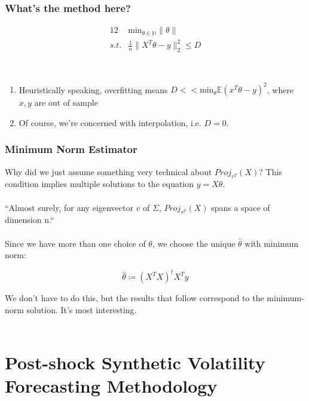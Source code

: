 \documentclass[pdf]{beamer}
\begin{document}
\begin{frame}
\frametitle{What's the method here?}
    \begin{alignat*}{12}
    & \text{min}_{\theta \in \mathbb{H}}\|\theta\| \\
     s.t. & \frac{1}{n}\|X^{T}\theta - y\|^{2}_{2} \leq D
    \end{alignat*}

\\
\begin{enumerate}
\item<3-4> Heuristically speaking, overfitting means $D << \text{min}_{\theta}\mathbb{E}(x^{T}\theta - y)^{2} $, where $x, y$ are out of sample
\item<4-4> Of course, we're concerned with interpolation, i.e. $D=0$.
\end{enumerate}

\end{frame}

\begin{frame}
\frametitle{Minimum Norm Estimator}

Why did we just assume something very technical about $Proj_{v^{T}}(X)$?  This condition implies multiple solutions to the equation $y = X\theta$.
\\~\\


``Almost surely, for any eigenvector $v$ of $\Sigma$, $Proj_{v^{T}}(X)$ spans a space of dimension n.`` \\~\\

Since we have more than one choice of $\theta$, we choose the unique $\hat\theta$ with minimum norm:

\[ \hat\theta \coloneqq (X^{T}X)^{\dagger}X^{T}y \]

  We don't have to do this, but the results that follow correspond to the minimum-norm solution.  It's most interesting. \\~\\


\end{frame}

\section{Post-shock Synthetic Volatility Forecasting Methodology}
\end{document}

